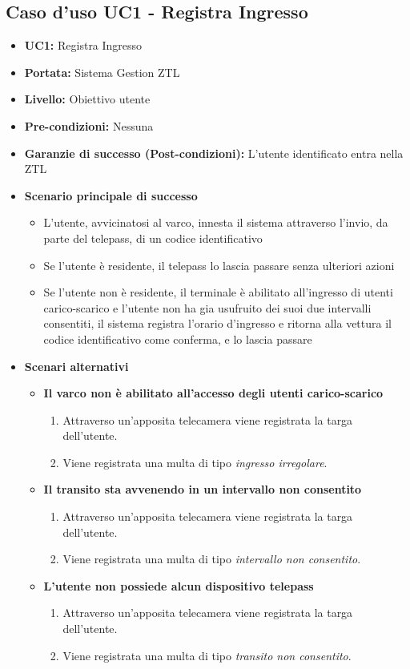 \documentclass[12pt, letterpaper]{article}
\begin{document}
\subsection{Caso d'uso UC1 - Registra Ingresso}

\begin{itemize}
\item \textbf{UC1:} Registra Ingresso
\item \textbf{Portata:} Sistema Gestion ZTL
\item \textbf{Livello:} Obiettivo utente
\item \textbf{Pre-condizioni:} Nessuna
\item \textbf{Garanzie di successo (Post-condizioni):} L'utente identificato entra nella ZTL

\item \textbf{Scenario principale di successo}
\begin{itemize}
    \item L'utente, avvicinatosi al varco, innesta il sistema attraverso l'invio, da parte del telepass, di un codice identificativo
    \item Se l'utente è residente, il telepass lo lascia passare senza ulteriori azioni
    \item Se l'utente non è residente, il terminale è abilitato all'ingresso di utenti carico-scarico e l'utente non ha gia usufruito dei suoi due intervalli consentiti, il sistema registra l'orario d'ingresso e ritorna alla vettura il codice identificativo come conferma, e lo lascia passare
\end{itemize}

\item \textbf{Scenari alternativi}
\begin{itemize}
    \item \textbf{Il varco non è abilitato all'accesso degli utenti carico-scarico}
    \begin{enumerate}
        \item Attraverso un'apposita telecamera viene registrata la targa dell'utente. 
        \item Viene registrata una multa di tipo \emph{ingresso irregolare}.
    \end{enumerate}
    \item \textbf{Il transito sta avvenendo in un intervallo non consentito}
    \begin{enumerate}
        \item Attraverso un'apposita telecamera viene registrata la targa dell'utente. 
        \item Viene registrata una multa di tipo \emph{intervallo non consentito}.   
    \end{enumerate}
    \item \textbf{L'utente non possiede alcun dispositivo telepass}
    \begin{enumerate}
        \item Attraverso un'apposita telecamera viene registrata la targa dell'utente. 
        \item Viene registrata una multa di tipo \emph{transito non consentito}.   
    \end{enumerate}
\end{itemize}


\end{itemize}
\end{document}
